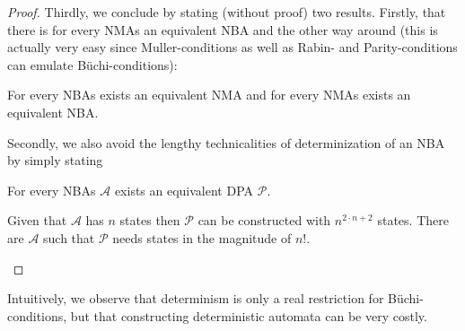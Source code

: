 \begin{proof}
  Thirdly, we conclude by stating (without proof) two results. Firstly, that
  there is for every \acp{NMA} an equivalent \ac{NBA} and the other way around
  (this is actually very easy since Muller-conditions as well as Rabin- and
  Parity-conditions can emulate Büchi-conditions):
  \begin{theorem}
    \cite[Theorem 1.10]{AutoLogInfGames}
    For every \acp{NBA} exists an equivalent \ac{NMA} and for every \acp{NMA}
    exists an equivalent \ac{NBA}.
  \end{theorem}
  Secondly, we also avoid the lengthy technicalities of determinization of an
  \ac{NBA} by simply stating
  \begin{theorem}
    \cite[Theorem 3.6]{AutoLogInfGames}
    \cite[Section 3.2]{NonDetBuechiToDetParity}
    \cite[Theorem 6]{OptBoundsAutoTrans}
    For every \acp{NBA} $\mathcal{A}$ exists an equivalent \ac{DPA}
    $\mathcal{P}$.

    Given that $\mathcal{A}$ has $n$ states then $\mathcal{P}$ can be
    constructed with $n^{2\cdot n + 2}$ states. There are $\mathcal{A}$
    such that $\mathcal{P}$ needs states in the magnitude of $n!$.
  \end{theorem}
\end{proof}
Intuitively, we observe that determinism is only a real restriction for
Büchi-conditions, but that constructing deterministic automata can be very
costly.

